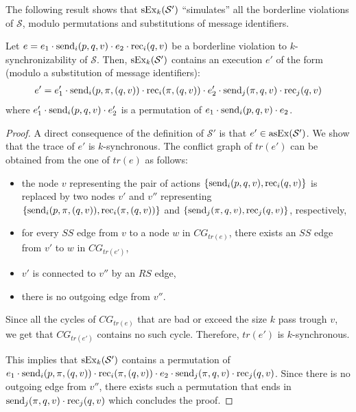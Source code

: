 The following result shows that $\synchExec{\mathcal{S'}}{k}$ ``simulates'' all the borderline violations of $\mathcal{S}$, modulo permutations and substitutions of message identifiers. 

\begin{theorem}
Let $e=e_1\cdot \send{i}{p,q,v}\cdot e_2\cdot \rec{i}{q,v}$ be a borderline violation to $k$-synchronizability of $\mathcal{S}$. Then, $\synchExec{\mathcal{S'}}{k}$ contains an execution $e'$ of the form (modulo a substitution of message identifiers): 
\begin{align*}
e'=e_1'\cdot \send{i}{p,\pi,(q,v)}\cdot \rec{i}{\pi,(q,v)}\cdot e_2'\cdot \send{j}{\pi,q,v}\cdot \rec{j}{q,v}
\end{align*}
where $e_1'\cdot \send{i}{p,q,v} \cdot e_2'$ is a permutation of $e_1\cdot \send{i}{p,q,v}\cdot e_2$.
\end{theorem}
\begin{proof}
A direct consequence of the definition of $\mathcal{S'}$ is that $e'\in\asynchExec{\mathcal{S'}}$. We show that the trace of $e'$ is $k$-synchronous. The conflict graph of $tr(e')$ can be obtained from the one of $tr(e)$ as follows:
\begin{itemize}
	\item the node $v$ representing the pair of actions $\{\send{i}{p,q,v},\rec{i}{q,v}\}$ is replaced by two nodes $v'$ and $v''$ representing $\{\send{i}{p,\pi,(q,v)}, \rec{i}{\pi,(q,v)}\}$ and $\{\send{j}{\pi,q,v}, \rec{j}{q,v}\}$, respectively,
	\item for every $SS$ edge from $v$ to a node $w$ in $CG_{tr(e)}$, there exists an $SS$ edge from $v'$ to $w$ in $CG_{tr(e')}$,
	\item $v'$ is connected to $v''$ by an $RS$ edge,
	\item there is no outgoing edge from $v''$.
\end{itemize}
Since all the cycles of $CG_{tr(e)}$ that are bad or exceed the size $k$ pass trough $v$, we get that $CG_{tr(e')}$ contains no such cycle.
Therefore, $tr(e')$ is $k$-synchronous. 

This implies that $\synchExec{\mathcal{S'}}{k}$ contains a permutation of $e_1\cdot \send{i}{p,\pi,(q,v)}\cdot \rec{i}{\pi,(q,v)}\cdot e_2\cdot \send{j}{\pi,q,v}\cdot \rec{j}{q,v}$. Since there is no outgoing edge from $v''$, there exists such a permutation that ends in $\send{j}{\pi,q,v}\cdot \rec{j}{q,v}$ which concludes the proof.
\end{proof}


